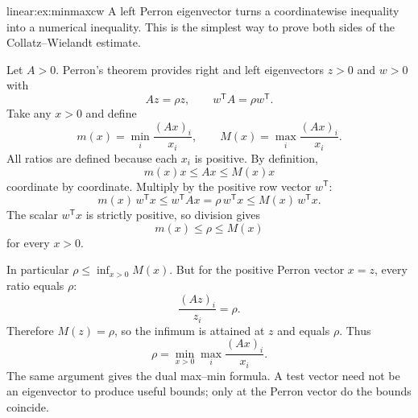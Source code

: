 \begin{solution}{linear:ex:minmaxcw}
\idea A left Perron eigenvector turns a coordinatewise inequality into a numerical inequality. This is the simplest way to prove both sides of the Collatz--Wielandt estimate.

\writeup Let $A>0$. Perron's theorem provides right and left eigenvectors $z>0$ and $w>0$ with
\[
Az=\rho z,\qquad w^{\mathsf T}A=\rho w^{\mathsf T}.
\]
Take any $x>0$ and define
\[
m(x)=\min_i\frac{(Ax)_i}{x_i},
\qquad
M(x)=\max_i\frac{(Ax)_i}{x_i}.
\]
All ratios are defined because each $x_i$ is positive. By definition,
\[
m(x)x\le Ax\le M(x)x
\]
coordinate by coordinate. Multiply by the positive row vector $w^{\mathsf T}$:
\[
m(x)\,w^{\mathsf T}x
\le w^{\mathsf T}Ax
=\rho\,w^{\mathsf T}x
\le M(x)\,w^{\mathsf T}x.
\]
The scalar $w^{\mathsf T}x$ is strictly positive, so division gives
\[
\boxed{m(x)\le\rho\le M(x)}
\]
for every $x>0$.

In particular $\rho\le\inf_{x>0}M(x)$. But for the positive Perron vector $x=z$, every ratio equals $\rho$:
\[
\frac{(Az)_i}{z_i}=\rho.
\]
Therefore $M(z)=\rho$, so the infimum is attained at $z$ and equals $\rho$. Thus
\[
\boxed{\rho=\min_{x>0}\max_i\frac{(Ax)_i}{x_i}}.
\]
The same argument gives the dual max--min formula. A test vector need not be an eigenvector to produce useful bounds; only at the Perron vector do the bounds coincide.
\end{solution}

